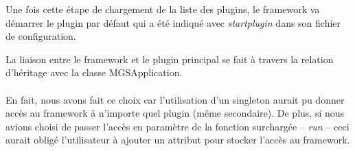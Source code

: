 \documentclass[12pt,a4paper]{article}
\begin{document}
Une fois cette étape de chargement de la liste des plugins, le framework va 
démarrer le plugin par défaut qui a été indiqué avec \emph{startplugin} dans son 
fichier de configuration.

La liaison entre le framework et le plugin principal se fait à travers la relation 
d'héritage avec la classe MGSApplication. 
\\\\
En fait, nous avons fait ce choix car l'utilisation d'un singleton aurait pu 
donner accès au framework à n'importe quel plugin (même secondaire). De plus, si 
nous avions choisi de passer l'accès en paramètre de la fonction surchargée -- 
\emph{run} -- ceci aurait obligé l'utilisateur à ajouter un attribut pour stocker 
l'accès au framework.
\end{document}
